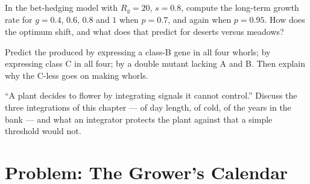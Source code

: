 \begin{exercise}[$\star\star\star$]\label{exo:b2:plant-flowering:10}
In the bet-hedging model with $R_g = 20$, $s = 0.8$, compute the
long-term growth rate for $g = 0.4$, $0.6$, $0.8$ and $1$ when
$p = 0.7$, and again when $p = 0.95$. How does the optimum shift,
and what does that predict for deserts versus meadows?
\end{exercise}

\begin{exercise}[$\star\star\star$]\label{exo:b2:plant-flowering:11}
Predict the  produced by expressing a class-B gene in all
four whorls; by expressing class C in all four; by a double mutant
lacking A and B. Then explain why the C-less  goes on making
whorls.
\end{exercise}

\begin{exercise}[$\star\star\star$]\label{exo:b2:plant-flowering:12}
``A plant decides to flower by integrating signals it cannot
control.'' Discuss the three integrations of this chapter --- of
day length, of cold, of the years in the  bank --- and what an
integrator protects the plant against that a simple threshold
would not.
\end{exercise}

\section{Problem: The Grower's Calendar}

